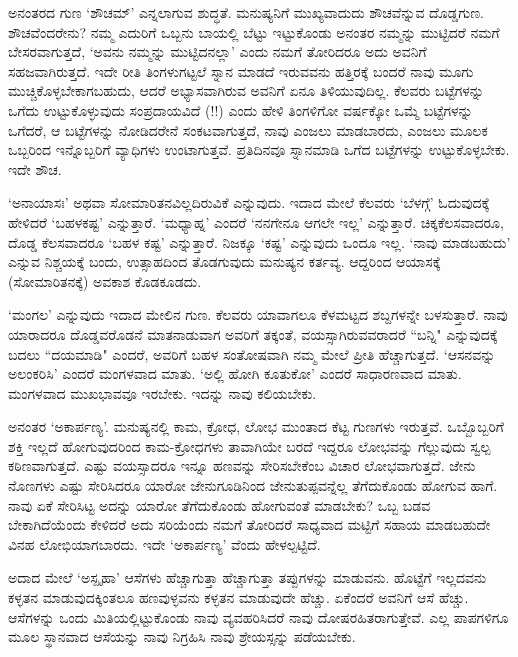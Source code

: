 ಅನಂತರದ ಗುಣ `ಶೌಚಮ್' 
ಎನ್ನಲಾಗುವ ಶುದ್ಧತೆ. 
ಮನುಷ್ಯನಿಗೆ ಮುಖ್ಯವಾದುದು 
ಶೌಚವೆನ್ನುವ ದೊಡ್ಡಗುಣ. 
ಶೌಚವೆಂದರೇನು? ನಮ್ಮ ಎದುರಿಗೆ 
ಒಬ್ಬನು ಬಾಯಲ್ಲಿ ಬೆಟ್ಟು 
ಇಟ್ಟುಕೊಂಡು ಅನಂತರ ನಮ್ಮನ್ನು 
ಮುಟ್ಟಿದರೆ ನಮಗೆ 
ಬೇಸರವಾಗುತ್ತದೆ, `ಅವನು 
ನಮ್ಮನ್ನು ಮುಟ್ಟಿದನಲ್ಲಾ' 
ಎಂದು ನಮಗೆ ತೋರಿದರೂ ಅದು 
ಅವನಿಗೆ ಸಹಜವಾಗಿರುತ್ತದೆ. 
ಇದೇ ರೀತಿ ತಿಂಗಳುಗಟ್ಟಲೆ 
ಸ್ನಾನ ಮಾಡದೆ ಇರುವವನು 
ಹತ್ತಿರಕ್ಕೆ ಬಂದರೆ ನಾವು 
ಮೂಗು 
ಮುಚ್ಚಿಕೊಳ್ಳಬೇಕಾಗಬಹುದು, 
ಆದರೆ ಅಭ್ಯಾಸವಾಗಿರುವ ಅವನಿಗೆ 
ಏನೂ ತಿಳಿಯುವುದಿಲ್ಲ. ಕೆಲವರು 
ಬಟ್ಟೆಗಳನ್ನು ಒಗೆದು 
ಉಟ್ಟುಕೊಳ್ಳುವುದು 
ಸಂಪ್ರದಾಯವಿದೆ (!!) ಎಂದು ಹೇಳಿ 
ತಿಂಗಳಿಗೋ ವರ್ಷಕ್ಕೋ ಒಮ್ಮೆ 
ಬಟ್ಟೆಗಳನ್ನು ಒಗೆದರೆ, ಆ 
ಬಟ್ಟೆಗಳನ್ನು ನೋಡಿದರೇನೆ 
ಸಂಕಟವಾಗುತ್ತದೆ, ನಾವು ಎಂಜಲು 
ಮಾಡಬಾರದು, ಎಂಜಲು ಮೂಲಕ 
ಒಬ್ಬರಿಂದ ಇನ್ನೊಬ್ಬರಿಗೆ 
ವ್ಯಾಧಿಗಳು ಉಂಟಾಗುತ್ತವೆ. 
ಪ್ರತಿದಿನವೂ ಸ್ನಾನಮಾಡಿ ಒಗೆದ ಬಟ್ಟೆಗಳನ್ನು ಉಟ್ಟುಕೊಳ್ಳಬೇಕು. ಇದೇ ಶೌಚ.

`ಅನಾಯಾಸಃ' ಅಥವಾ 
ಸೋಮಾರಿತನವಿಲ್ಲದಿರುವಿಕೆ 
ಎನ್ನುವುದು. ಇದಾದ ಮೇಲೆ 
ಕೆಲವರು `ಬೆಳಗ್ಗೆ' 
ಓದುವುದಕ್ಕೆ ಹೇಳಿದರೆ 
`ಬಹಳಕಷ್ಟ' ಎನ್ನುತ್ತಾರೆ. 
`ಮಧ್ಯಾಹ್ನ' ಎಂದರೆ `ನನಗೇನೂ 
ಆಗಲೇ ಇಲ್ಲ' ಎನ್ನುತ್ತಾರೆ. 
ಚಿಕ್ಕಕೆಲಸವಾದರೂ, ದೊಡ್ಡ 
ಕೆಲಸವಾದರೂ `ಬಹಳ ಕಷ್ಟ' 
ಎನ್ನುತ್ತಾರೆ. ನಿಜಕ್ಕೂ `ಕಷ್ಟ' 
ಎನ್ನುವುದು ಒಂದೂ ಇಲ್ಲ. `ನಾವು 
ಮಾಡಬಹುದು' ಎನ್ನುವ 
ನಿಶ್ಚಯಕ್ಕೆ ಬಂದು, 
ಉತ್ಸಾಹದಿಂದ ತೊಡಗುವುದು 
ಮನುಷ್ಯನ ಕರ್ತವ್ಯ. ಆದ್ದರಿಂದ ಆಯಾಸಕ್ಕೆ  (ಸೋಮಾರಿತನಕ್ಕೆ) ಅವಕಾಶ ಕೊಡಕೂಡದು.

`ಮಂಗಲ' ಎನ್ನುವುದು ಇದಾದ ಮೇಲಿನ 
ಗುಣ. ಕೆಲವರು ಯಾವಾಗಲೂ 
ಕೆಳಮಟ್ಟದ ಶಬ್ದಗಳನ್ನೇ 
ಬಳಸುತ್ತಾರೆ. ನಾವು ಯಾರಾದರೂ 
ದೊಡ್ಡವರೊಡನೆ ಮಾತನಾಡುವಾಗ 
ಅವರಿಗೆ ತಕ್ಕಂತೆ, 
ವಯಸ್ಸಾಗಿರುವವರಾದರೆ ``ಬನ್ನಿ" 
ಎನ್ನುವುದಕ್ಕೆ ಬದಲು ``ದಯಮಾಡಿ" 
ಎಂದರೆ, ಅವರಿಗೆ ಬಹಳ 
ಸಂತೋಷವಾಗಿ ನಮ್ಮ ಮೇಲೆ 
ಪ್ರೀತಿ ಹೆಚ್ಚಾಗುತ್ತದೆ. 
`ಆಸನವನ್ನು ಅಲಂಕರಿಸಿ' ಎಂದರೆ 
ಮಂಗಳವಾದ ಮಾತು. `ಅಲ್ಲಿ ಹೋಗಿ 
ಕೂತುಕೋ' ಎಂದರೆ ಸಾಧಾರಣವಾದ 
ಮಾತು. ಮಂಗಳವಾದ ಮುಖಭಾವವೂ ಇರಬೇಕು. ಇದನ್ನು ನಾವು ಕಲಿಯಬೇಕು.

ಅನಂತರ `ಅಕಾರ್ಪಣ್ಯ'. 
ಮನುಷ್ಯನಲ್ಲಿ ಕಾಮ, ಕ್ರೋಧ, ಲೋಭ 
ಮುಂತಾದ ಕೆಟ್ಟ ಗುಣಗಳು 
ಇರುತ್ತವೆ. ಒಬ್ಬೊಬ್ಬರಿಗೆ 
ಶಕ್ತಿ ಇಲ್ಲದೆ ಹೋಗುವುದರಿಂದ 
ಕಾಮ-ಕ್ರೋಧಗಳು ತಾವಾಗಿಯೇ 
ಬರದೆ ಇದ್ದರೂ ಲೋಭವನ್ನು 
ಗೆಲ್ಲುವುದು ಸ್ವಲ್ಪ 
ಕಠಿಣವಾಗುತ್ತದೆ. ಎಷ್ಟು 
ವಯಸ್ಸಾದರೂ ಇನ್ನೂ ಹಣವನ್ನು 
ಸೇರಿಸಬೇಕೆಂಬ ವಿಚಾರ 
ಲೋಭವಾಗುತ್ತದೆ. ಜೇನು ನೊಣಗಳು 
ಎಷ್ಟು ಸೇರಿಸಿದರೂ ಯಾರೋ 
ಜೇನುಗೂಡಿನಿಂದ 
ಜೇನುತುಪ್ಪವನ್ನೆಲ್ಲ 
ತೆಗೆದುಕೊಂಡು ಹೋಗುವ ಹಾಗೆ. 
ನಾವು ಏಕೆ ಸೇರಿಸಿಟ್ಟ ಅದನ್ನು 
ಯಾರೋ ತೆಗೆದುಕೊಂಡು ಹೋಗುವಂತೆ 
ಮಾಡಬೇಕು? ಒಬ್ಬ ಬಡವ 
ಬೇಕಾಗಿದೆಯೆಂದು ಕೇಳಿದರೆ ಅದು 
ಸರಿಯೆಂದು ನಮಗೆ ತೋರಿದರೆ 
ಸಾಧ್ಯವಾದ ಮಟ್ಟಿಗೆ ಸಹಾಯ 
ಮಾಡಬಹುದೇ ವಿನಹ ಲೋಭಿಯಾಗಬಾರದು. ಇದೇ `ಅಕಾರ್ಪಣ್ಯ' ವೆಂದು ಹೇಳಲ್ಪಟ್ಟಿದೆ.

ಅದಾದ ಮೇಲೆ `ಅಸ್ಪೃಹಾ' ಆಸೆಗಳು 
ಹೆಚ್ಚಾಗುತ್ತಾ 
ಹೆಚ್ಚಾಗುತ್ತಾ ತಪ್ಪುಗಳನ್ನು 
ಮಾಡುವನು. ಹೊಟ್ಟೆಗೆ 
ಇಲ್ಲದವನು ಕಳ್ಳತನ 
ಮಾಡುವುದಕ್ಕಿಂತಲೂ 
ಹಣವುಳ್ಳವನು ಕಳ್ಳತನ 
ಮಾಡುವುದೇ ಹೆಚ್ಚು. ಏಕೆಂದರೆ 
ಅವನಿಗೆ ಆಸೆ ಹೆಚ್ಚು. 
ಆಸೆಗಳನ್ನು ಒಂದು 
ಮಿತಿಯಲ್ಲಿಟ್ಟುಕೊಂಡು ನಾವು 
ವ್ಯವಹರಿಸಿದರೆ ನಾವು 
ದೋಷರಹಿತರಾಗುತ್ತೇವೆ. ಎಲ್ಲ 
ಪಾಪಗಳಿಗೂ ಮೂಲ ಸ್ಥಾನವಾದ 
ಆಸೆಯನ್ನು ನಾವು ನಿಗ್ರಹಿಸಿ ನಾವು ಶ್ರೇಯಸ್ಸನ್ನು ಪಡೆಯಬೇಕು.

